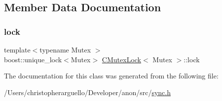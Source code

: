 \subsection{Member Data Documentation}
\mbox{\label{class_c_mutex_lock_a2f3b4666271388be42da0198ba717744}} 
\subsubsection{\texorpdfstring{lock}{lock}}
{\footnotesize\ttfamily template$<$typename Mutex $>$ \\
boost\+::unique\+\_\+lock$<$Mutex$>$ \mbox{\hyperlink{class_c_mutex_lock}{C\+Mutex\+Lock}}$<$ Mutex $>$\+::lock\hspace{0.3cm}{\ttfamily [private]}}



The documentation for this class was generated from the following file\+:\begin{DoxyCompactItemize}
\item 
/\+Users/christopherarguello/\+Developer/anon/src/\mbox{\hyperlink{sync_8h}{sync.\+h}}\end{DoxyCompactItemize}
